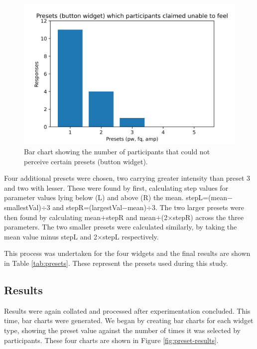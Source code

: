 \documentclass{mpaper}
\begin{document}
\begin{figure}
    \centering
    \includegraphics[scale=0.44]{images/Presets (button widget) which participants claimed unable to feel.png}
    \caption{Bar chart showing the number of participants that could not perceive certain presets (button widget).}
    \label{fig:presets-not-felt}
\end{figure}

Four additional presets were chosen, two carrying greater intensity than preset 3 and two with lesser. These were found by first, calculating step values for parameter values lying below (L) and above (R) the mean. stepL=(mean$-$ smallestVal)$\div$3 and stepR=(largestVal$-$mean)$\div$3. The two larger presets were then found by calculating mean$+$stepR and mean$+$(2$\times$stepR) across the three parameters. The two smaller presets were calculated similarly, by taking the mean value minus stepL and 2$\times$stepL respectively.

This process was undertaken for the four widgets and the final results are shown in Table \ref{tab:presets}. These represent the presets used during this study.\\

\subsection{Results} \label{results-2}
Results were again collated and processed after experimentation concluded. This time, bar charts were generated. We began by creating bar charts for each widget type, showing the preset value against the number of times it was selected by participants. These four charts are shown in Figure \ref{fig:preset-results}.
\end{document}
